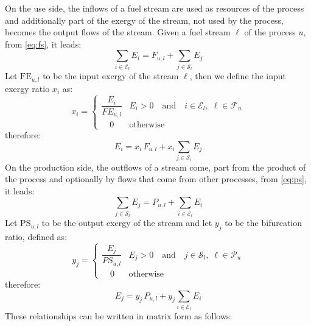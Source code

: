 \documentclass{ecos2018}
\begin{document}
On the use side, the inflows of a fuel stream are used as resources of the process and additionally part of the exergy of the stream, not used by the process, becomes the output flows of the stream. Given a fuel stream $\ell$ of the process $u$, from \cref{eq:fs}, it leads:
\begin{equation}
\sum_{i\in\mathcal{E}_l} E_i = F_{u,l} + \sum_{j\in\mathcal{S}_l} E_j
\end{equation}
Let $\mathrm{FE}_{u,l}$ to be the input exergy of the stream $\ell$, then we define the input exergy ratio $x_i$ as:
\begin{equation}
x_i=\begin{cases}
\dfrac{E_i}{FE_{u,l}}& E_i>0 \quad \text{and} \quad i\in\mathcal{E}_l,\; \ell\in\mathcal{F}_u \\[1em]
\quad0&\text{otherwise}
\end{cases}
\end{equation}
therefore:
\begin{equation}
E_i = x_i \, F_{u,l} + x_i\sum_{j\in\mathcal{S}_l} E_j
\end{equation}
On the production side, the outflows of a stream come, part from the product of the process and optionally by flows that come from other processes, from \cref{eq:ps}, it leads:
\begin{equation}
\sum_{j\in\mathcal{S}_l} E_j = P_{u,l} + \sum_{i\in\mathcal{E}_l} E_i
\end{equation}
Let $\mathrm{PS}_{u,l}$ to be the output exergy of the stream and let $y_j$ to be the bifurcation ratio, defined as:
\begin{equation}
y_j=\begin{cases}
\dfrac{E_j}{PS_{u,l}}& E_j>0 \quad \text{and} \quad j\in\mathcal{S}_l,\; \ell\in\mathcal{P}_u \\[1em]
\quad0&\text{otherwise}
\end{cases}
\end{equation}
therefore:
\begin{equation}
E_j = y_j \, P_{u,l} + y_j\sum_{i\in\mathcal{E}_l} E_i
\end{equation}
These relationships can be written in matrix form as follows:
\end{document}
